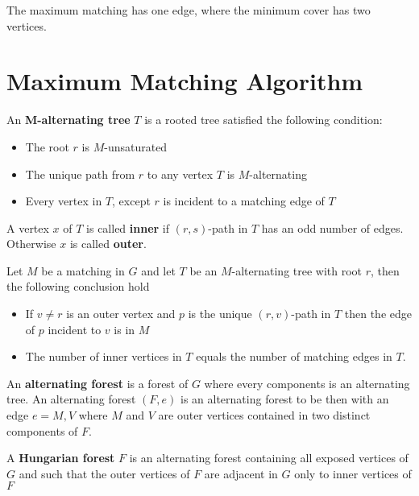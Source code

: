 			The maximum matching has one edge, where the minimum cover has two vertices.

		\section{Maximum Matching Algorithm}
			\begin{definition}
				An \textbf{M-alternating tree} $T$ is a rooted tree satisfied the following condition:
				\begin{itemize}
					\item The root $r$ is $M$-unsaturated
					\item The unique path from $r$ to any vertex $T$ is $M$-alternating
					\item Every vertex in $T$, except $r$ is incident to a matching edge of $T$
				\end{itemize}
				A vertex $x$ of $T$ is called \textbf{inner} if $(r, s)$-path in $T$ has an odd number of edges. Otherwise $x$ is called \textbf{outer}.
			\end{definition}

			\begin{lemma}
				Let $M$ be a matching in $G$ and let $T$ be an $M$-alternating tree with root $r$, then the following conclusion hold
				\begin{itemize}
					\item If $v \neq r$ is an outer vertex and $p$ is the unique $(r,v)$-path in $T$ then the edge of $p$ incident to $v$ is in $M$
					\item The number of inner vertices in $T$ equals the number of matching edges in $T$.
				\end{itemize}
			\end{lemma}

			\begin{definition}
				An \textbf{alternating forest} is a forest of $G$ where every components is an alternating tree. An alternating forest $(F, e)$ is an alternating forest to be then with an edge $e = M, V$ where $M$ and $V$ are outer vertices contained in two distinct components of $F$.
			\end{definition}

			\begin{example}
				A \textbf{Hungarian forest} $F$ is an alternating forest containing all exposed vertices of $G$ and such that the outer vertices of $F$ are adjacent in $G$ only to inner vertices of $F$
			\end{example}

